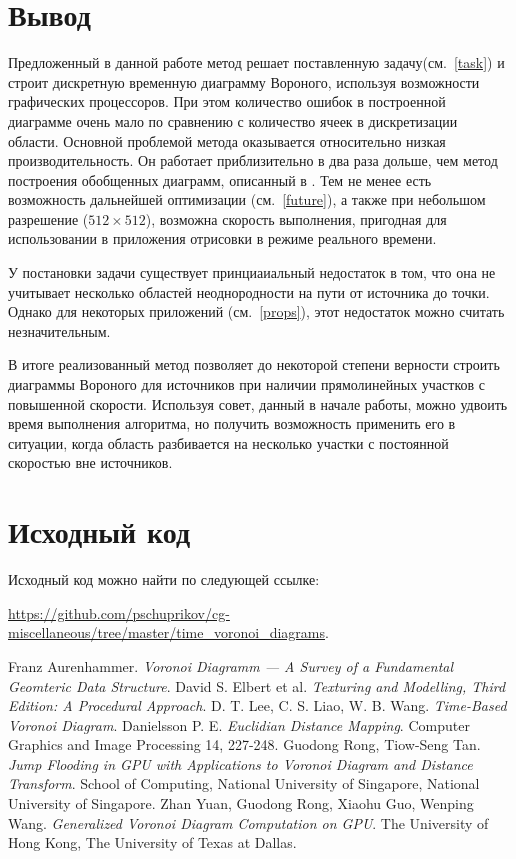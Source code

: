 \documentclass[12pt]{article}
\begin{document}
\section{Вывод}
Предложенный в данной работе метод решает поставленную задачу(см.~\ref{task})
и строит дискретную временную диаграмму Вороного, используя возможности графических
процессоров. При этом количество ошибок в построенной диаграмме очень мало по 
сравнению с количество ячеек в дискретизации области. Основной проблемой метода
оказывается относительно низкая производительность. Он работает 
приблизительно в два раза дольше, чем метод построения обобщенных диаграмм, 
описанный в \cite{gvd}. Тем не менее есть возможность дальнейшей оптимизации
(см.~\ref{future}), а также при небольшом разрешение ($512\times512$), возможна
скорость выполнения, пригодная для использовании в приложения отрисовки в режиме
реального времени.

У постановки задачи существует принциаиальный недостаток в том, что она не 
учитывает несколько областей неоднородности на пути от источника до точки. 
Однако для некоторых приложений (см.~\ref{props}), этот недостаток можно 
считать незначительным.

В итоге реализованный метод позволяет до некоторой степени верности строить
диаграммы Вороного для источников при наличии прямолинейных участков с повышенной
скорости. Используя совет, данный в начале работы, можно удвоить время выполнения
алгоритма, но получить возможность применить его в ситуации, когда область 
разбивается на несколько участки с постоянной скоростью вне источников.
\pagebreak

\section{Исходный код}
\label{source}
Исходный код можно найти по следующей ссылке: 

\url{https://github.com/pschuprikov/cg-miscellaneous/tree/master/time_voronoi_diagrams}.

\begin{thebibliography}{10}
 Franz Aurenhammer. \textit{Voronoi Diagramm --- A Survey of a Fundamental Geomteric Data Structure}.
 David S. Elbert et al. \textit{Texturing and Modelling, Third Edition: A Procedural Approach}.
 D. T. Lee, C. S. Liao, W. B. Wang. \textit{Time-Based Voronoi Diagram}.
 Danielsson P. E. \textit{Euclidian Distance Mapping}. Computer Graphics and Image Processing 14, 227-248.
 Guodong Rong, Tiow-Seng Tan. \textit{Jump Flooding in GPU with Applications to Voronoi Diagram and Distance Transform}. School of Computing, National University of Singapore, National University of Singapore. 
 Zhan Yuan, Guodong Rong, Xiaohu Guo, Wenping Wang. \textit{Generalized Voronoi Diagram Computation on GPU}. The University of Hong Kong, The University of Texas at Dallas.
\end{thebibliography}
\end{document}
